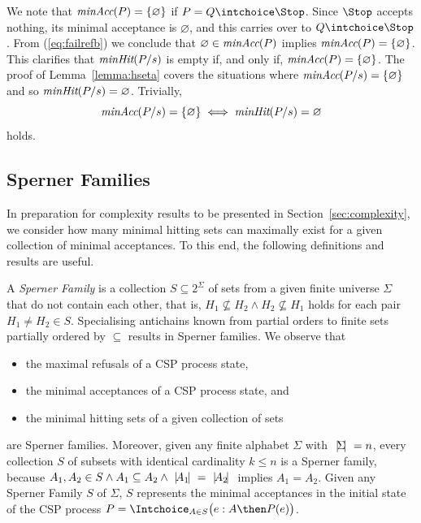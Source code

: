 %
We note that $\text{\it minAcc}(P) = \{ \varnothing \}$ if $P = Q\intchoice \Stop$.
Since $\Stop$ accepts nothing, its minimal acceptance is $\varnothing$, and
this carries over to $Q\intchoice \Stop$.  From (\ref{eq:failrefb}) we
conclude that $\varnothing\in\text{\it minAcc}(P)$ implies $\text{\it minAcc}(P) = \{
\varnothing \}$. This clarifies that $\text{\it minHit}(P/s)$ is empty if, and only
if, $\text{\it minAcc}(P) = \{ \varnothing \}$. The proof of Lemma~\ref{lemma:hseta}
covers the situations where $\text{\it minAcc}(P/s) = \{ \varnothing \}$ and so
$\text{\it minHit}(P/s) = \varnothing$. Trivially,
\begin{equation}
\label{eq:minhitminaccempty}
\text{\it minAcc}(P/s) = \{ \varnothing \} \iff \text{\it minHit}(P/s) = \varnothing
\end{equation}
holds.

\subsection{Sperner Families}
\label{sec:sperner}

In preparation for complexity results to be presented in
Section~\ref{sec:complexity}, we consider how many minimal hitting sets can
maximally exist for a given collection of minimal acceptances. To this end,
the following definitions and results are useful.

A \emph{Sperner Family} is a collection $S \subseteq 2^\Sigma$ of sets from a
given finite universe $\Sigma$ that do not contain each other, that is, $H_1
\not\subseteq H_2 \wedge H_2 \not\subseteq H_1$ holds for each pair $H_1\neq
H_2\in S$. Specialising antichains known from partial orders to finite sets
partially ordered by $\subseteq$ results in Sperner families. We observe that
\begin{itemize}
\item the maximal refusals of a CSP process state,
\item the minimal acceptances of a CSP process state, and
\item the minimal hitting sets of a given collection of sets
\end{itemize}
are Sperner families. Moreover, given any finite alphabet $\Sigma$ with
${~|\! \Sigma\!|~} = n$, every collection $S$ of subsets with identical
cardinality $k \le n$ is a Sperner family,  because $A_1, A_2\in S \wedge A_1
\subseteq A_2\wedge {~|\! A_1\!|~} = {~|\! A_2\!|~}$ implies $A_1 = A_2$. Given  any
Sperner Family $S$ of $\Sigma$, $S$ represents the minimal acceptances in the
initial state of the CSP process
$P = \Intchoice_{A\in S}\big( e:A \then P(e) \big)$.

